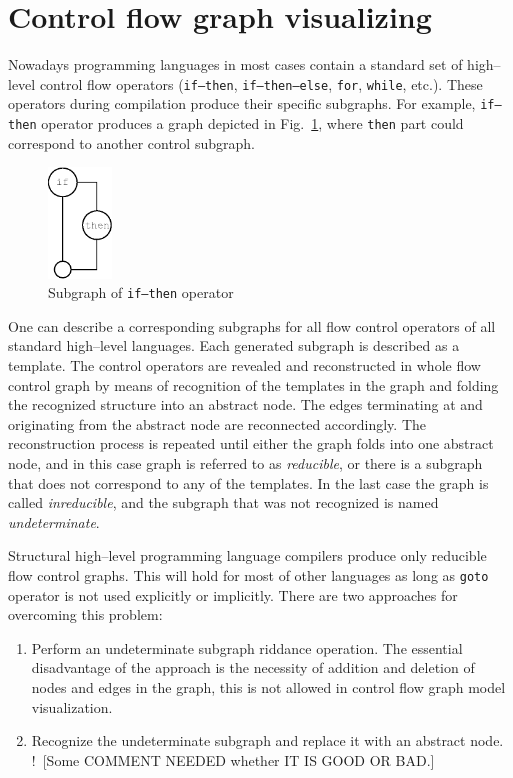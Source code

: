 \documentclass[conference]{IEEEtran}
\newcommand{\nnn}[2][ncolor]{\noindent%
\textcolor{eclr}{!\ [}\textcolor{#1}{#2}\textcolor{eclr}{]}}
\begin{document}
\section{Control flow graph visualizing}
\label{sec:cfg-vis}

Nowadays programming languages in most cases contain a standard set of high--level control flow operators (\texttt{if--then}, \texttt{if--then--else}, \texttt{for}, \texttt{while}, etc.).  These operators during compilation produce their specific subgraphs.  For example, \texttt{if--then} operator produces a graph depicted in Fig.~\ref{fig:IfSt}, where \texttt{then} part could correspond to another control subgraph.
\begin{figure}[htbp]
	\centering
		\includegraphics[width=0.15\textwidth]{Pic/Pic2.eps}
	\caption{Subgraph of \texttt{if--then} operator}
	\label{fig:IfSt}
\end{figure}

One can describe a corresponding subgraphs for all flow control operators of all standard high--level languages.  Each generated subgraph is described as a template.  The control operators are revealed and reconstructed in whole flow control graph by means of recognition of the templates in the graph and folding the recognized structure into an abstract node.  The edges terminating at and originating from the abstract node are reconnected accordingly.  The reconstruction process is repeated until either the graph folds into one abstract node, and in this case graph is referred to as \emph{reducible}, or there is a subgraph that does not correspond to any of the templates.  In the last case the graph is called \emph{inreducible}, and the subgraph that was not recognized is named \emph{undeterminate}.

Structural high--level programming language compilers produce only reducible flow control graphs.  This will hold for most of other languages as long as \texttt{goto} operator is not used explicitly or implicitly.  There are two approaches for overcoming this problem:
\begin{enumerate}
\item Perform an undeterminate subgraph riddance operation.  The essential disadvantage of the approach is the necessity of addition and deletion of nodes and edges in the graph, this is not allowed in control flow graph model visualization.
\item Recognize the undeterminate subgraph and replace it with an abstract node.  \nnn{Some COMMENT NEEDED whether IT IS GOOD OR BAD.}
\end{enumerate}
\end{document}
